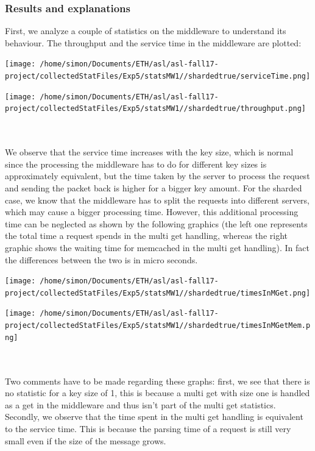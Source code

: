 \documentclass[11pt,a4paper]{article}
\begin{document}
\subsubsection{Results and explanations}
First, we analyze a couple of statistics on the middleware to understand its behaviour. The throughput and the service time in the middleware are plotted:
\\
\begin{minipage}{0.5\linewidth}
\texttt{[image: /home/simon/Documents/ETH/asl/asl-fall17-project/collectedStatFiles/Exp5/statsMW1//shardedtrue/serviceTime.png]}
\end{minipage}
\hfill
\begin{minipage}{0.5\linewidth}
\texttt{[image: /home/simon/Documents/ETH/asl/asl-fall17-project/collectedStatFiles/Exp5/statsMW1//shardedtrue/throughput.png]}
\end{minipage}
\\\\
We observe that the service time increases with the key size, which is normal since the processing the middleware has to do for different key sizes is approximately equivalent, but the time taken by the server to process the request and sending the packet back is higher for a bigger key amount. For the sharded case, we know that the middleware has to split the requests into different servers, which may cause a bigger processing time. However, this additional processing time can be neglected as shown by the following graphics (the left one represents the total time a request spends in the multi get handling, whereas the right graphic shows the waiting time for memcached in the multi get handling). In fact the differences between the two is in micro seconds. 
\\
\begin{minipage}{0.5\linewidth}
\texttt{[image: /home/simon/Documents/ETH/asl/asl-fall17-project/collectedStatFiles/Exp5/statsMW1//shardedtrue/timesInMGet.png]}
\end{minipage}
\hfill
\begin{minipage}{0.5\linewidth}
\texttt{[image: /home/simon/Documents/ETH/asl/asl-fall17-project/collectedStatFiles/Exp5/statsMW1//shardedtrue/timesInMGetMem.png]}
\end{minipage}
\\\\
Two comments have to be made regarding these graphs: first, we see that there is no statistic for a key size of 1, this is because a multi get with size one is handled as a get in the middleware and thus isn't part of the multi get statistics. Secondly, we observe that the time spent in the multi get handling is equivalent to the service time. This is because the parsing time of a request is still very small even if the size of the message grows.
\end{document}
